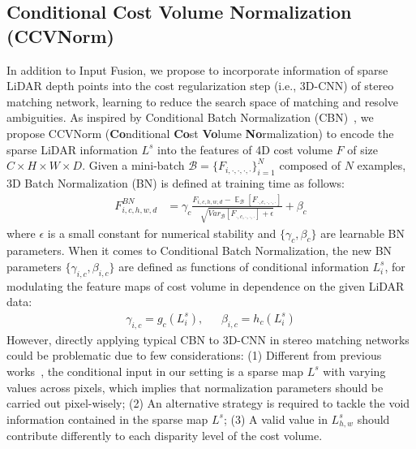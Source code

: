 \documentclass[letterpaper, 10 pt, conference]{ieeeconf}
\newcommand{\modelNameIncatPunc}{Input Fusion}
\newcommand{\modelNameCBN}{CCVNorm }
\newcommand{\modelNameCBNPunc}{CCVNorm}
\newcommand{\expectation}{\mathop{\mathbb{E}}}
\begin{document}
{\subsection{Conditional Cost Volume Normalization (\modelNameCBNPunc)}{
\label{ssec:ccvnorm}
In addition to \modelNameIncatPunc, we propose to incorporate information of sparse LiDAR depth points into the cost regularization step (i.e., 3D-CNN) of stereo matching network, learning to reduce the search space of matching and resolve ambiguities. As inspired by Conditional Batch Normalization (CBN)~\cite{cbnlanguage}\cite{cbnreasoning}, we propose \modelNameCBN (\textbf{Co}nditional \textbf{Co}st \textbf{Vo}lume \textbf{No}rmalization) to encode the sparse LiDAR information $L^{s}$ into the features of 4D cost volume $F$ of size $C\times H\times W\times D$. Given a mini-batch $\mathcal{B}=\{F_{i,\cdot,\cdot,\cdot,\cdot}\}_{i=1}^{N}$ composed of $N$ examples, 3D Batch Normalization (BN) is defined at training time as follows:
\begin{equation}
	\begin{split}
	F^{BN}_{i,c,h,w,d} &= \gamma_c \frac{F_{i,c,h,w,d}-\expectation_{\mathcal{B}}[F_{\cdot,c,\cdot,\cdot,\cdot}]}{\sqrt{Var_{\mathcal{B}}[F_{\cdot,c,\cdot,\cdot,\cdot}]+\epsilon}} + \beta_c
    \end{split}
    \label{eq:bn}
\end{equation}
\noindent where $\epsilon$ is a small constant for numerical stability and $\{\gamma_c, \beta_c\}$ are learnable BN parameters. 
When it comes to Conditional Batch Normalization, the new BN parameters $\{\gamma_{i,c}, \beta_{i,c}\}$ are defined as functions of conditional information $L^s_i$, for modulating the feature maps of cost volume in dependence on the given LiDAR data:
\begin{equation}
	\begin{split}
	\gamma_{i,c}=g_c(L^s_i),~~~~~~~\beta_{i,c}=h_c(L^s_i)
    \end{split}
    \label{eq:cbn}
\end{equation}
However, directly applying typical CBN to 3D-CNN in stereo matching networks could be problematic due to few considerations: (1) Different from previous works~\cite{cbnlanguage}\cite{cbnreasoning}, the conditional input in our setting is a sparse map $L^s$ with varying values across pixels, which implies that normalization parameters should be carried out pixel-wisely; (2) An alternative strategy is required to tackle the void information contained in the sparse map $L^s$; (3) A valid value in $L^s_{h,w}$ should contribute differently to each disparity level of the cost volume.

}}
\end{document}
